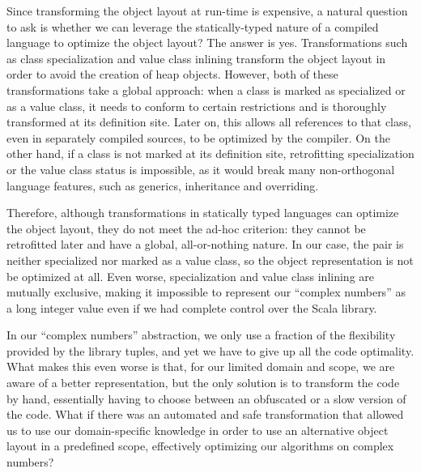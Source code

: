 Since transforming the object layout at run-time is expensive, a natural question to ask is whether we can leverage the statically-typed nature of a compiled language to optimize the object layout? The answer is yes. Transformations such as class specialization and value class inlining transform the object layout in order to avoid the creation of heap objects. However, both of these transformations take a global approach: when a class is marked as specialized or as a value class, it needs to conform to certain restrictions and is thoroughly transformed at its definition site. Later on, this allows all references to that class, even in separately compiled sources, to be optimized by the compiler. On the other hand, if a class is not marked at its definition site, retrofitting specialization or the value class status is impossible, as it would break many non-orthogonal language features, such as generics, inheritance and overriding. %

Therefore, although transformations in statically typed languages can optimize the object layout, they do not meet the ad-hoc criterion: they cannot be retrofitted later and have a global, all-or-nothing nature. In our case, the pair is neither specialized nor marked as a value class, so the object representation is not be optimized at all. Even worse, specialization and value class inlining are mutually exclusive, making it impossible to represent our ``complex numbers'' as a long integer value even if we had complete control over the Scala library.

In our ``complex numbers'' abstraction, we only use a fraction of the flexibility provided by the library tuples, and yet we have to give up all the code optimality. What makes this even worse is that, for our limited domain and scope, we are aware of a better representation, but the only solution is to transform the code by hand, essentially having to choose between an obfuscated or a slow version of the code. What if there was an automated and safe transformation that allowed us to use our domain-specific knowledge in order to use an alternative object layout in a predefined scope, effectively optimizing our algorithms on complex numbers?


